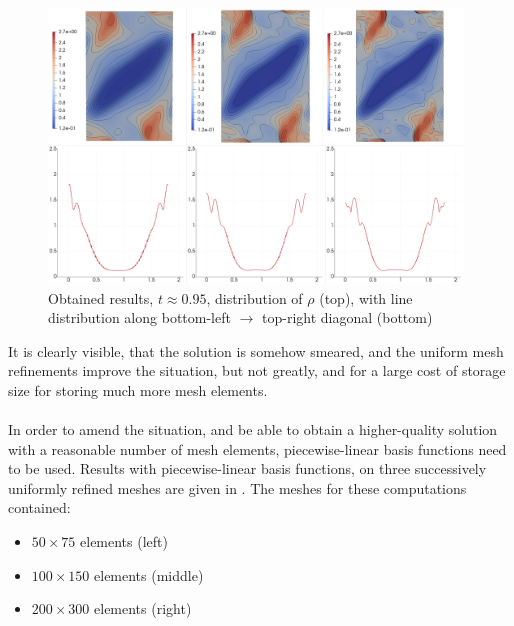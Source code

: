 \begin{figure}[H]
	\begin{center}
		\includegraphics[width=0.98\textwidth]{img/mhd-blast/new/blast,noadapt18.jpg}
\vspace{-3mm}
	\caption{Obtained results, $t \approx 0.95$, distribution of $\rho$ (top), with line distribution along bottom-left $\rightarrow$ top-right diagonal (bottom)}
	\label{figure:blastNew06}
	\end{center}
\end{figure}
\vspace{-8mm}

It is clearly visible, that the solution is somehow smeared, and the uniform mesh refinements improve the situation, but not greatly, and for a large cost of storage size for storing much more mesh elements.
\paragraph{}
In order to amend the situation, and be able to obtain a higher-quality solution with a reasonable number of mesh elements, piecewise-linear basis functions need to be used. Results with piecewise-linear basis functions, on three successively uniformly refined meshes are given in . The meshes for these computations contained:
\begin{itemize}
\item $50 \times 75$ elements (left)
\item $100 \times 150$ elements (middle)
\item $200 \times 300$ elements (right)
\end{itemize}

